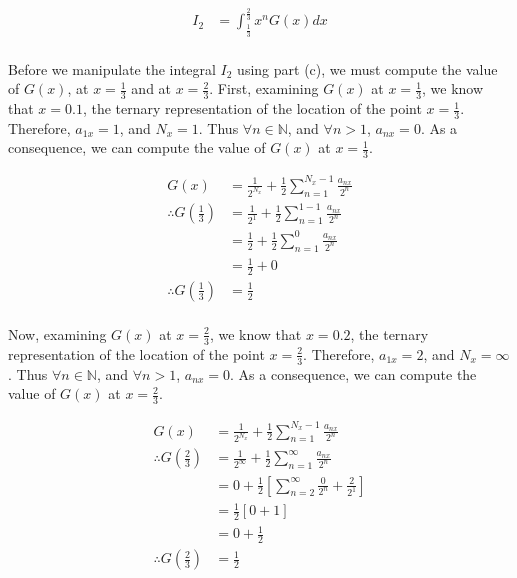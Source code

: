 \documentclass[a4paper]{article}
\begin{document}
\begin{enumerate}[label=\textbf{\arabic*.}]
\begin{enumerate}
		\begin{align*}
		I_2 & = \int_{\frac{1}{3}}^{\frac{2}{3}}x^{n}G(x)dx\\
		\end{align*}

		\pagebreak

		Before we manipulate the integral $I_2$ using part (c), we must compute the value of $G(x)$, at $x = \frac{1}{3}$ and at $x = \frac{2}{3}$. First, examining $G(x)$ at $x = \frac{1}{3}$, we know that $x = 0.1$, the ternary representation of the location of the point $x = \frac{1}{3}$. Therefore, $a_{1x} = 1$, and $N_x = 1$. Thus $\forall n \in \mathbb{N}$, and $\forall n > 1$, $a_{nx} = 0$. As a consequence, we can compute the value of $G(x)$ at $x = \frac{1}{3}$.

		\begin{align*}
		G(x) & = \frac{1}{2^{N_x}} + \frac{1}{2}\sum_{n=1}^{N_x-1}\frac{a_{nx}}{2^{n}}\\
		\therefore G\left(\frac{1}{3}\right) & = \frac{1}{2^{1}} + \frac{1}{2}\sum_{n=1}^{1-1}\frac{a_{nx}}{2^{n}}\\
		& = \frac{1}{2} + \frac{1}{2}\sum_{n=1}^{0}\frac{a_{nx}}{2^{n}}\\
		& = \frac{1}{2} + 0\\
		\therefore G\left(\frac{1}{3}\right) & = \frac{1}{2}\\
		\end{align*}

		Now, examining $G(x)$ at $x = \frac{2}{3}$, we know that $x = 0.2$, the ternary representation of the location of the point $x = \frac{2}{3}$. Therefore, $a_{1x} = 2$, and $N_x = \infty$. Thus $\forall n \in \mathbb{N}$, and $\forall n > 1$, $a_{nx} = 0$. As a consequence, we can compute the value of $G(x)$ at $x = \frac{2}{3}$.

		\begin{align*}
		G(x) & = \frac{1}{2^{N_x}} + \frac{1}{2}\sum_{n=1}^{N_x-1}\frac{a_{nx}}{2^{n}}\\
		\therefore G\left(\frac{2}{3}\right) & = \frac{1}{2^{\infty}} + \frac{1}{2}\sum_{n=1}^{\infty}\frac{a_{nx}}{2^{n}}\\
		& = 0 + \frac{1}{2}\left[\sum_{n=2}^{\infty}\frac{0}{2^{n}} + \frac{2}{2^{1}}\right]\\
		& = \frac{1}{2}\left[0 + 1\right]\\
		& = 0 + \frac{1}{2}\\
		\therefore G\left(\frac{2}{3}\right) & = \frac{1}{2}\\
		\end{align*}


\end{enumerate}
\end{enumerate}
\end{document}
